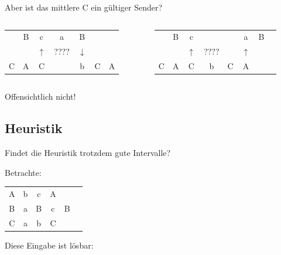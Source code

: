 \documentclass[ignorenonframetext]{beamer}
\newcommand{\mybreak}{\par\vspace*{\baselineskip}}
\begin{document}
\begin{frame}
	Aber ist das mittlere C ein gültiger Sender?\mybreak\mybreak


	\begin{columns}
		\begin{column}{6cm}
			\begin{tabular}{ccccccc}
				& B & c &  a  & B \\
				&   & $\uparrow$ &  ???? & $\downarrow$\\
				C & A & C &     & b & C & A
			\end{tabular} 
		\end{column}

		\begin{column}{6cm}
			\begin{tabular}{cccccccc}
				& B & c &   &   & a  & B \\
				&   & $\uparrow$ &  ???? && $\uparrow$ & \\
				C & A & C & b & C & A
			\end{tabular} 
		\end{column}
	\end{columns}\mybreak\mybreak

	Offensichtlich nicht!
\end{frame}

\subsection{Heuristik}
\begin{frame}
	Findet die Heuristik trotzdem gute Intervalle?\mybreak
	
	Betrachte:\mybreak
	
	\begin{center}
		\begin{tabular}{cccccc}
		A & b & c & A\\
		B & a & B & c & B\\
		C & a & b & C
	\end{tabular}
\end{center} \mybreak
	
	Diese Eingabe ist lösbar:\mybreak
	
	
\end{frame}
\end{document}
